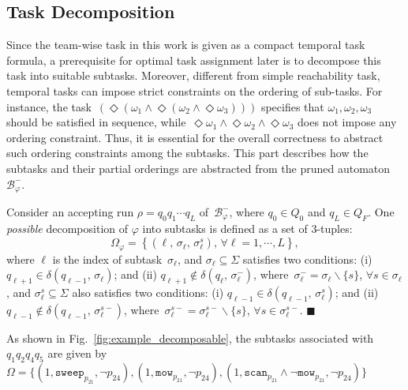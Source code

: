 \subsection{Task Decomposition}\label{subsubsec:task-decompose}
Since the team-wise task in this work is given as a compact temporal task formula,
a prerequisite for optimal task assignment later is to decompose this task into suitable subtasks.
Moreover, different from simple reachability task,
temporal tasks can impose strict constraints on the ordering of sub-tasks.
For instance, the task~$(\Diamond (\omega_1 \land \Diamond (\omega_2 \land \Diamond\omega_3))) $
specifies that $\omega_1,\omega_2,\omega_3$ should be satisfied in sequence,
while~$\Diamond\omega_1\land\Diamond\omega_2\land\Diamond\omega_3$ does not impose any ordering constraint.
Thus, it is essential for the overall correctness to abstract such ordering constraints among the subtasks.
This part describes how the subtasks and their partial orderings are abstracted from the pruned automaton~$\mathcal{B}_{\varphi}^{-}$.

\begin{definition} \label{def:subtasks}
Consider an accepting run $\rho=q_0q_1\cdots q_L$ of~$\mathcal{B}_{\varphi}^{-}$,
where $q_0\in Q_0$ and $q_L\in Q_F$.
One \emph{possible} decomposition of $\varphi$ into subtasks is defined
as a set of 3-tuples:
\begin{equation}\label{eq:subtask}
\Omega_{\varphi} = \left\{(\ell,\, \sigma_\ell,\, \sigma^{s}_\ell),\, \forall \ell=1,\cdots,L\right\},
\end{equation}
where $\ell$ is the index of subtask~$\sigma_\ell$,
and $\sigma_\ell\subseteq \Sigma$ satisfies two conditions:
(i) $q_{\ell+1} \in \delta(q_{\ell-1},\,\sigma_\ell)$;
and (ii) $q_{\ell+1} \notin \delta(q_\ell,\,\sigma^-_\ell)$, where~$\sigma^-_\ell =  \sigma_\ell \backslash \{s\}$, $\forall s\in \sigma_\ell$, 
and $\sigma^{s}_\ell\subseteq \Sigma$ also satisfies two conditions:
(i) $q_{\ell-1} \in \delta(q_{\ell-1},\,\sigma^{s}_\ell)$;
and (ii) $q_{\ell-1} \notin \delta(q_{\ell-1},\,\sigma^{s-}_\ell)$, where~$\sigma^{s-}_\ell =  \sigma^{s-}_\ell \backslash \{s\}$, $\forall s\in \sigma^{s-}_\ell$. 
\hfill $\blacksquare$
\end{definition}

\begin{example}
	\label{example:subtask}
        {As shown in Fig.~\ref{fig:example_decomposable},
          the subtasks associated with~$q_1q_2q_4q_5$ are given
          by~$\Omega=\{(1,\texttt{sweep}_{p_{21}} ,\lnot p_{24}),
(1,\texttt{mow}_{p_{21}} ,\lnot p_{24}),
(1,\texttt{scan}_{p_{21}}\land\lnot \texttt{mow}_{p_{21}} ,\lnot p_{24})\}$}
\end{example}


